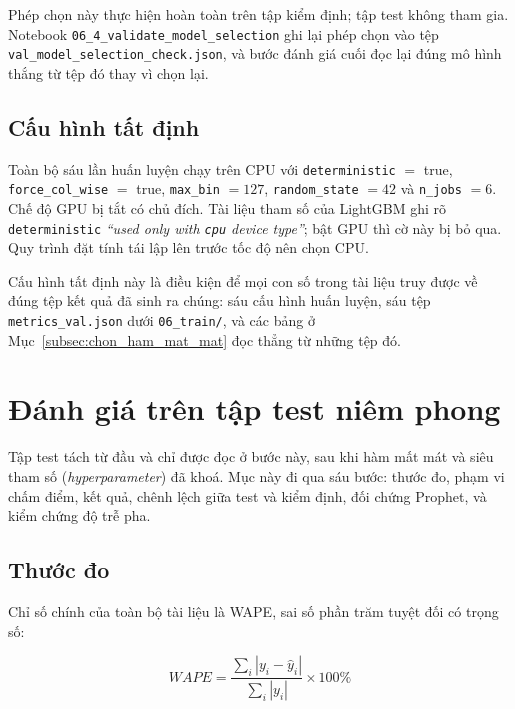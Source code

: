 \documentclass[12pt, a4paper]{report}
\begin{document}
Phép chọn này thực hiện hoàn toàn trên tập kiểm định; tập test không tham gia. Notebook
\texttt{06\_4\_validate\_model\_selection} ghi lại phép chọn vào tệp
\texttt{val\_model\_selection\_check.json}, và bước đánh giá cuối đọc lại đúng mô hình thắng
từ tệp đó thay vì chọn lại.

\FloatBarrier
\subsection{Cấu hình tất định}
\label{subsec:cau_hinh_tat_dinh}

Toàn bộ sáu lần huấn luyện chạy trên CPU với \texttt{deterministic} $=$ true,
\texttt{force\_col\_wise} $=$ true, \texttt{max\_bin} $=127$, \texttt{random\_state} $=42$ và
\texttt{n\_jobs} $=6$. Chế độ GPU bị tắt có chủ đích. Tài liệu tham số của LightGBM ghi rõ
\texttt{deterministic} \textit{``used only with \texttt{cpu} device type''}; bật GPU thì cờ này
bị bỏ qua. Quy trình đặt tính tái lập lên trước tốc độ nên chọn CPU.



Cấu hình tất định này là điều kiện để mọi con số trong tài liệu truy được về đúng tệp kết
quả đã sinh ra chúng: sáu cấu hình huấn luyện, sáu tệp \texttt{metrics\_val.json} dưới
\texttt{06\_train/}, và các bảng ở Mục~\ref{subsec:chon_ham_mat_mat} đọc thẳng từ những tệp đó.

\FloatBarrier
\section{Đánh giá trên tập test niêm phong}
\label{sec:danh_gia_tren_tap_test}

Tập test tách từ đầu và chỉ được đọc ở bước này, sau khi hàm mất mát và siêu tham số
(\textit{hyperparameter}) đã khoá. Mục này đi qua sáu bước: thước đo, phạm vi chấm điểm, kết
quả, chênh lệch giữa test và kiểm định, đối chứng Prophet, và kiểm chứng độ trễ pha.

\FloatBarrier
\subsection{Thước đo}

Chỉ số chính của toàn bộ tài liệu là WAPE, sai số phần trăm tuyệt đối có trọng số:

\begin{equation}
WAPE = \frac{\sum_i \left| y_i - \hat{y}_i \right|}{\sum_i \left| y_i \right|} \times 100\%
\end{equation}
\end{document}
